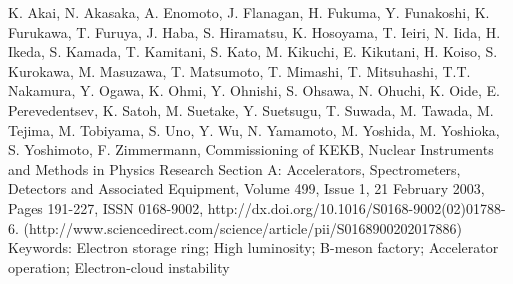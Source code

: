 K. Akai, N. Akasaka, A. Enomoto, J. Flanagan, H. Fukuma, Y. Funakoshi, K. Furukawa, T. Furuya, J. Haba, S. Hiramatsu, K. Hosoyama, T. Ieiri, N. Iida, H. Ikeda, S. Kamada, T. Kamitani, S. Kato, M. Kikuchi, E. Kikutani, H. Koiso, S. Kurokawa, M. Masuzawa, T. Matsumoto, T. Mimashi, T. Mitsuhashi, T.T. Nakamura, Y. Ogawa, K. Ohmi, Y. Ohnishi, S. Ohsawa, N. Ohuchi, K. Oide, E. Perevedentsev, K. Satoh, M. Suetake, Y. Suetsugu, T. Suwada, M. Tawada, M. Tejima, M. Tobiyama, S. Uno, Y. Wu, N. Yamamoto, M. Yoshida, M. Yoshioka, S. Yoshimoto, F. Zimmermann, Commissioning of KEKB, Nuclear Instruments and Methods in Physics Research Section A: Accelerators, Spectrometers, Detectors and Associated Equipment, Volume 499, Issue 1, 21 February 2003, Pages 191-227, ISSN 0168-9002, http://dx.doi.org/10.1016/S0168-9002(02)01788-6.
(http://www.sciencedirect.com/science/article/pii/S0168900202017886)
Keywords: Electron storage ring; High luminosity; B-meson factory; Accelerator operation; Electron-cloud instability